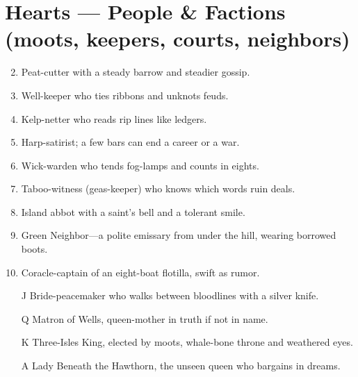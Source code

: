 \section*{Hearts --- People \& Factions (moots, keepers, courts, neighbors)}
\label{sec:theona-people}
\begin{enumerate}
\setcounter{enumi}{1}
\item Peat-cutter with a steady barrow and steadier gossip.
\item Well-keeper who ties ribbons and unknots feuds.
\item Kelp-netter who reads rip lines like ledgers.
\item Harp-satirist; a few bars can end a career or a war.
\item Wick-warden who tends fog-lamps and counts in eights.
\item Taboo-witness (geas-keeper) who knows which words ruin deals.
\item Island abbot with a saint's bell and a tolerant smile.
\item Green Neighbor---a polite emissary from under the hill, wearing borrowed boots.
\item Coracle-captain of an eight-boat flotilla, swift as rumor.
\item[J] Bride-peacemaker who walks between bloodlines with a silver knife.
\item[Q] Matron of Wells, queen-mother in truth if not in name.
\item[K] Three-Isles King, elected by moots, whale-bone throne and weathered eyes.
\item[A] Lady Beneath the Hawthorn, the unseen queen who bargains in dreams.
\end{enumerate}

